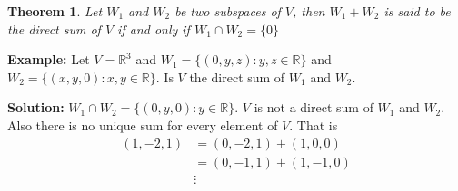 \documentclass[a4paper, titlepage]{article}
\newtheorem{theorem}{Theorem}[section]
\begin{document}
        \begin{theorem}
            Let $W_1$ and $W_2$ be two subspaces of $V$, then 
            $W_1 + W_2$ is said to be the direct sum of $V$ if and 
            only if $W_1 \cap W_2 = \{ 0 \}$
        \end{theorem}
        
        \noindent \textbf{Example:} Let $V = \mathbb{R}^3$ and $W_1 =
        \{ (0, y, z) : y, z \in \mathbb{R} \}$ and $W_2 = \{ (x, y, 0) 
        : x, y \in \mathbb{R} \}$. Is $V$ the direct sum of $W_1$ 
        and $W_2$.

        \noindent\textbf{Solution:} $W_1 \cap W_2 = \{ (0, y, 0) : y \in 
        \mathbb{R} \}$. $V$ is not a direct sum of $W_1$ and $W_2$.
        Also there is no unique sum for every element of $V$. That is
        \begin{align*}
            (1, -2, 1) &= (0, -2, 1) + (1, 0, 0) \\
                       &= (0, -1, 1) + (1, -1, 0) \\
                       & \vdots
        \end{align*}

        \setlength{\fboxsep}{1em}
        \noindent{}
\end{document}
